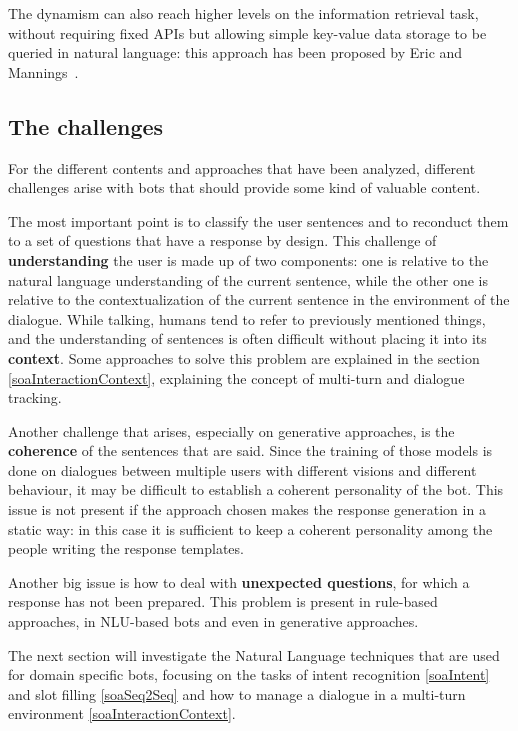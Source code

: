 The dynamism can also reach higher levels on the information retrieval task, without requiring fixed APIs but allowing simple key-value data storage to be queried in natural language: this approach has been proposed by Eric and Mannings~\cite{eric2017key}.

\subsection{The challenges}
\label{soaChallenges}

For the different contents and approaches that have been analyzed, different challenges arise with bots that should provide some kind of valuable content.

The most important point is to classify the user sentences and to reconduct them to a set of questions that have a response by design. This challenge of \textbf{understanding} the user is made up of two components: one is relative to the natural language understanding of the current sentence, while the other one is relative to the contextualization of the current sentence in the environment of the dialogue. While talking, humans tend to refer to previously mentioned things, and the understanding of sentences is often difficult without placing it into its \textbf{context}. Some approaches to solve this problem are explained in the section \ref{soaInteractionContext}, explaining the concept of multi-turn and dialogue tracking.

Another challenge that arises, especially on generative approaches, is the \textbf{coherence} of the sentences that are said. Since the training of those models is done on dialogues between multiple users with different visions and different behaviour, it may be difficult to establish a coherent personality of the bot. This issue is not present if the approach chosen makes the response generation in a static way: in this case it is sufficient to keep a coherent personality among the people writing the response templates.

Another big issue is how to deal with \textbf{unexpected questions}, for which a response has not been prepared. This problem is present in rule-based approaches, in NLU-based bots and even in generative approaches.

The next section will investigate the Natural Language techniques that are used for domain specific bots, focusing on the tasks of intent recognition \ref{soaIntent} and slot filling \ref{soaSeq2Seq} and how to manage a dialogue in a multi-turn environment \ref{soaInteractionContext}.

